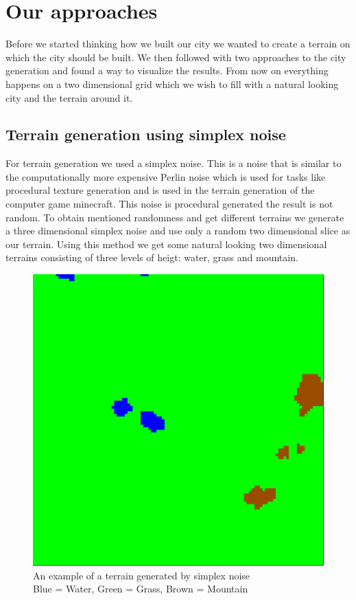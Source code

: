 \documentclass{scrartcl}
\begin{document}
\section{Our approaches}
Before we started thinking how we built our city we wanted to create a terrain
on which the city should be built. We then followed with two approaches to the
city generation and found a way to visualize the results.
From now on everything happens on a two dimensional grid which we wish to fill
with a natural looking city and the terrain around it.


\subsection{Terrain generation using simplex noise}

For terrain generation we used a simplex noise. This is a noise that is similar
to the computationally more expensive Perlin noise which is used for tasks like
procedural texture generation and is used in the terrain generation of the computer
game minecraft. This noise is procedural generated the result is not random. To
obtain mentioned randomness and get different terrains we generate
a three dimensional simplex noise and use only a random two dimensional slice as our terrain.
Using this method we get some natural looking two dimensional terrains consisting
of three levels of heigt: water, grass and mountain.
\begin{figure}
  \centering
  \includegraphics[scale = 0.2]{terrain_example}
  \caption{An example of a terrain generated by simplex noise \\Blue = Water, Green = Grass, Brown = Mountain}
\end{figure}
\end{document}
